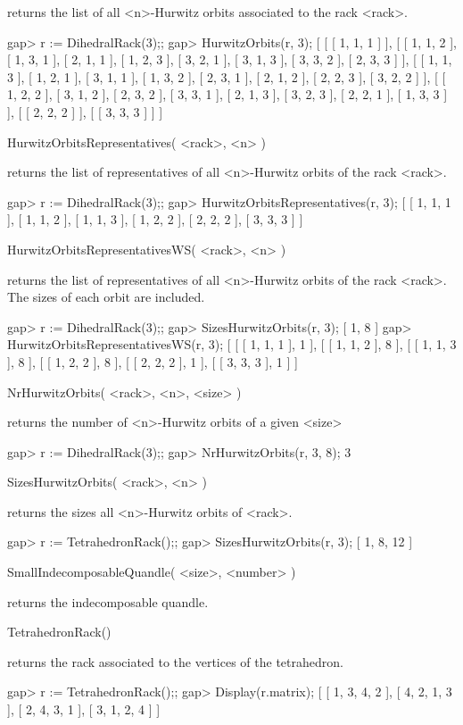 returns the list of all <n>-Hurwitz orbits associated to the rack <rack>.

\beginexample
gap> r := DihedralRack(3);;
gap> HurwitzOrbits(r, 3);
[ [ [ 1, 1, 1 ] ], [ [ 1, 1, 2 ], [ 1, 3, 1 ], [ 2, 1, 1 ], [ 1, 2, 3 ], [ 3, 2, 1 ], [ 3, 1, 3 ], [ 3, 3, 2 ], 
      [ 2, 3, 3 ] ], [ [ 1, 1, 3 ], [ 1, 2, 1 ], [ 3, 1, 1 ], [ 1, 3, 2 ], [ 2, 3, 1 ], [ 2, 1, 2 ], [ 2, 2, 3 ], 
      [ 3, 2, 2 ] ], [ [ 1, 2, 2 ], [ 3, 1, 2 ], [ 2, 3, 2 ], [ 3, 3, 1 ], [ 2, 1, 3 ], [ 3, 2, 3 ], [ 2, 2, 1 ], 
      [ 1, 3, 3 ] ], [ [ 2, 2, 2 ] ], [ [ 3, 3, 3 ] ] ]
\endexample

\>HurwitzOrbitsRepresentatives( <rack>, <n> )

returns the list of representatives of all <n>-Hurwitz orbits of the rack <rack>.

\beginexample
gap> r := DihedralRack(3);;
gap> HurwitzOrbitsRepresentatives(r, 3);
[ [ 1, 1, 1 ], [ 1, 1, 2 ], [ 1, 1, 3 ], [ 1, 2, 2 ], [ 2, 2, 2 ], [ 3, 3, 3 ] ]
\endexample

\>HurwitzOrbitsRepresentativesWS( <rack>, <n> )

returns the list of representatives of all <n>-Hurwitz orbits of the rack
<rack>. The sizes of each orbit are included.

\beginexample
gap> r := DihedralRack(3);;
gap> SizesHurwitzOrbits(r, 3);
[ 1, 8 ]
gap> HurwitzOrbitsRepresentativesWS(r, 3);
[ [ [ 1, 1, 1 ], 1 ], [ [ 1, 1, 2 ], 8 ], [ [ 1, 1, 3 ], 8 ], [ [ 1, 2, 2 ], 8 ], [ [ 2, 2, 2 ], 1 ], [ [ 3, 3, 3 ], 1 ] ]
\endexample

\>NrHurwitzOrbits( <rack>, <n>, <size> )

returns the number of <n>-Hurwitz orbits of a given <size>

\beginexample
gap> r := DihedralRack(3);;
gap> NrHurwitzOrbits(r, 3, 8);
3
\endexample

\>SizesHurwitzOrbits( <rack>, <n> )

returns the sizes all <n>-Hurwitz orbits of <rack>.

\beginexample
gap> r := TetrahedronRack();;
gap> SizesHurwitzOrbits(r, 3);
[ 1, 8, 12 ]
\endexample

\>SmallIndecomposableQuandle( <size>, <number> )

returns the indecomposable quandle.

\>TetrahedronRack()

returns the rack associated to the vertices of the tetrahedron.

\beginexample
gap> r := TetrahedronRack();;
gap> Display(r.matrix);
[ [  1,  3,  4,  2 ],
  [  4,  2,  1,  3 ],
  [  2,  4,  3,  1 ],
  [  3,  1,  2,  4 ] ]
\endexample


